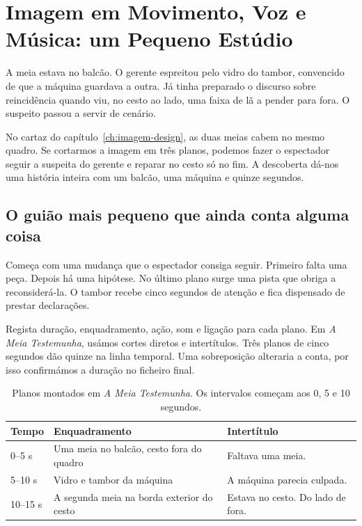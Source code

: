 \chapter{Imagem em Movimento, Voz e Música: um Pequeno Estúdio}
\label{ch:audiovisual}

\ficcao A meia estava no balcão. O gerente espreitou pelo vidro do tambor, convencido de que a máquina guardava a outra. Já tinha preparado o discurso sobre reincidência quando viu, no cesto ao lado, uma faixa de lã a pender para fora. O suspeito passou a servir de cenário.

No cartaz do capítulo~\ref{ch:imagem-design}, as duas meias cabem no mesmo quadro. Se cortarmos a imagem em três planos, podemos fazer o espectador seguir a suspeita do gerente e reparar no cesto só no fim. A descoberta dá-nos uma história inteira com um balcão, uma máquina e quinze segundos.

\section{O guião mais pequeno que ainda conta alguma coisa}
Começa com uma mudança que o espectador consiga seguir. Primeiro falta uma peça. Depois há uma hipótese. No último plano surge uma pista que obriga a reconsiderá-la. O tambor recebe cinco segundos de atenção e fica dispensado de prestar declarações.

Regista duração, enquadramento, ação, som e ligação para cada plano. Em \emph{A Meia Testemunha}, usámos cortes diretos e intertítulos. Três planos de cinco segundos dão quinze na linha temporal. Uma sobreposição alteraria a conta, por isso confirmámos a duração no ficheiro final.

\begin{table}[htbp]
\small
\begin{tabularx}{\textwidth}{@{}l>{\raggedright\arraybackslash}X>{\raggedright\arraybackslash}X@{}}
\toprule
Tempo & Enquadramento & Intertítulo \\
\midrule
0–5 s & Uma meia no balcão, cesto fora do quadro & Faltava uma meia. \\
5–10 s & Vidro e tambor da máquina & A máquina parecia culpada. \\
10–15 s & A segunda meia na borda exterior do cesto & Estava no cesto. Do lado de fora. \\
\bottomrule
\end{tabularx}
\caption{Planos montados em \emph{A Meia Testemunha}. Os intervalos começam aos 0, 5 e 10 segundos.}
\label{tab:meia-planos}
\end{table}

